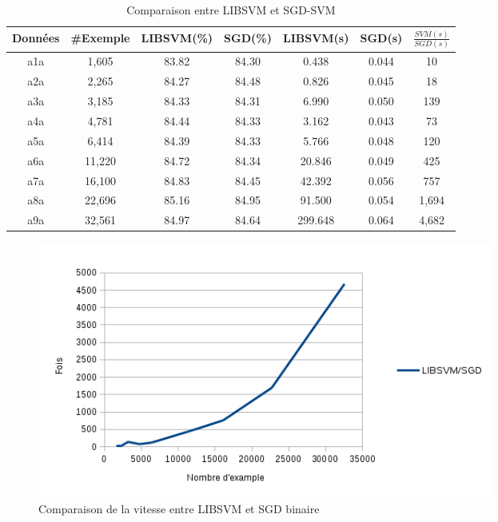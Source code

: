 \begin{table}
\begin{center}
    \begin{tabular}{ | c | c | c | c | c | c | c |}
    \hline
    Données & \#Exemple & LIBSVM(\%) & SGD(\%) & LIBSVM(s) & SGD(s) & $\frac{SVM(s)}{SGD(s)}$ \\ \hline
    
    a1a & 1,605 & 83.82 & 84.30 & 0.438 & 0.044 & 10 \\ \hline
    
    a2a & 2,265 & 84.27 & 84.48 & 0.826 & 0.045 & 18 \\ \hline
    
    a3a & 3,185 & 84.33 & 84.31 & 6.990 & 0.050 & 139 \\ \hline
    
    a4a & 4,781 & 84.44 & 84.33 & 3.162 & 0.043 & 73 \\ \hline
    
    a5a & 6,414 & 84.39 & 84.33 & 5.766 & 0.048 & 120 \\ \hline
    
    a6a & 11,220 & 84.72 & 84.34 & 20.846 & 0.049 & 425 \\ \hline
    
    a7a & 16,100 & 84.83 & 84.45 & 42.392 & 0.056 & 757 \\ \hline
    
    a8a & 22,696 & 85.16 & 84.95 & 91.500 & 0.054 & 1,694 \\ \hline
    
    a9a & 32,561 & 84.97 & 84.64 & 299.648 & 0.064 & 4,682 \\ \hline
    
    \end{tabular}
\end{center}
\caption{Comparaison entre LIBSVM et SGD-SVM}
\label{tab:svmsgd}
\end{table}

\begin{figure}[ht!]
\centering
\includegraphics[width=150mm]{images/res}
\caption{Comparaison de la vitesse entre LIBSVM et SGD binaire}
\label{fig:res}
\end{figure}

